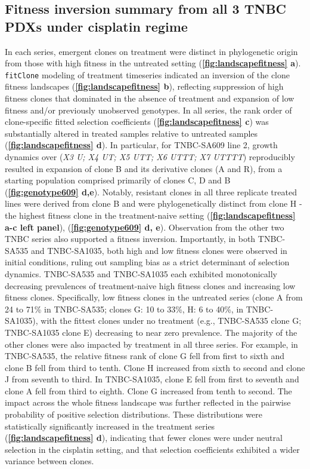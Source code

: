 \subsection{Fitness inversion summary from all 3 TNBC PDXs under cisplatin regime}
In each series, emergent clones on treatment were distinct in phylogenetic origin from those with high fitness in the untreated setting (\textbf{\autoref{fig:landscapefitness} a}). \texttt{fitClone} modeling of treatment timeseries indicated an inversion of the clone fitness landscapes (\textbf{\autoref{fig:landscapefitness} b}), reflecting suppression of high fitness clones that dominated in the absence of treatment and expansion of low fitness and/or previously unobserved genotypes. In all series, the rank order of clone-specific fitted selection coefficients (\textbf{\autoref{fig:landscapefitness} c}) was substantially altered in treated samples relative to untreated samples (\textbf{\autoref{fig:landscapefitness} d}). In particular, for TNBC-SA609 line 2, growth dynamics over (\textit{X3 U; X4 UT; X5 UTT; X6 UTTT; X7 UTTTT}) reproducibly resulted in expansion of clone B and its derivative clones (A and R), from a starting population comprised primarily of clones C, D and B (\textbf{\autoref{fig:genotype609} d,e}). Notably, resistant clones in all three replicate treated lines were derived from clone B and were phylogenetically distinct from clone H - the highest fitness clone in the treatment-naive setting  (\textbf{\autoref{fig:landscapefitness} a-c left panel}), (\textbf{\autoref{fig:genotype609} d, e}). Observation from the other two TNBC series also supported a fitness inversion. Importantly, in both TNBC-SA535 and TNBC-SA1035, both high and low fitness clones were observed in initial conditions, ruling out sampling bias as a strict determinant of selection dynamics. TNBC-SA535 and TNBC-SA1035 each exhibited monotonically decreasing prevalences of treatment-naive high fitness clones and increasing low fitness clones. Specifically, low fitness clones in the untreated series (clone A from 24 to 71\% in TNBC-SA535; clones G: 10 to 33\%, H: 6 to 40\%, in TNBC-SA1035), with the fittest clones under no treatment (e.g., TNBC-SA535 clone G; TNBC-SA1035 clone E) decreasing to near zero prevalence. The majority of the other clones were also impacted by treatment in all three series. For example, in TNBC-SA535, the relative fitness rank of clone G fell from first to sixth and clone B fell from third to tenth. Clone H increased from sixth to second and clone J from seventh to third. In TNBC-SA1035, clone E fell from first to seventh and clone A fell from third to eighth. Clone G increased from tenth to second. The impact across the whole fitness landscape was further reflected in the pairwise probability of positive selection distributions. These distributions were statistically significantly increased in the treatment series  (\textbf{\autoref{fig:landscapefitness} d}), indicating that fewer clones were under neutral selection in the cisplatin setting, and that selection coefficients exhibited a wider variance between clones. 
